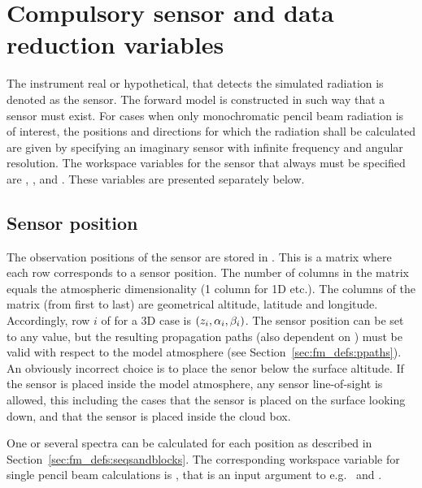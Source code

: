 \section{Compulsory sensor and data reduction variables}
\label{sec:fm_defs:sensor1}

The instrument real or hypothetical, that detects the simulated radiation is
denoted as the sensor. The forward model is constructed in
such way that a sensor must exist. For cases when only monochromatic pencil
beam radiation is of interest, the positions and directions for which the
radiation shall be calculated are given by specifying an imaginary sensor with
infinite frequency and angular resolution. The workspace variables for the
sensor that always must be specified are ,
,  and
. These variables are presented separately
below.


\subsection{Sensor position}
\label{sec:fm_defs:sensorpos}

The observation positions of the sensor are stored in
. This is a matrix where each row corresponds to
a sensor position. The number of columns in the matrix equals the
atmospheric dimensionality (1 column for 1D etc.). The columns of the
matrix (from first to last) are geometrical altitude, latitude and longitude.
Accordingly, row $i$ of  for a 3D case is
$(z_{i},\alpha_{i},\beta_{i})$. The sensor position can be set to any
value, but the resulting propagation paths (also dependent on
) must be valid with respect to the model
atmosphere (see Section~\ref{sec:fm_defs:ppaths}). An obviously
incorrect choice is to place the senor below the surface altitude. If
the sensor is placed inside the model atmosphere, any sensor
line-of-sight is allowed, this including the cases that the sensor is
placed on the surface looking down, and that the sensor is placed
inside the cloud box. 

One or several spectra can be calculated for each position as described in
Section~\ref{sec:fm_defs:seqsandblocks}. The corresponding workspace variable
for single pencil beam calculations is , that is an input
argument to e.g.\  and .



